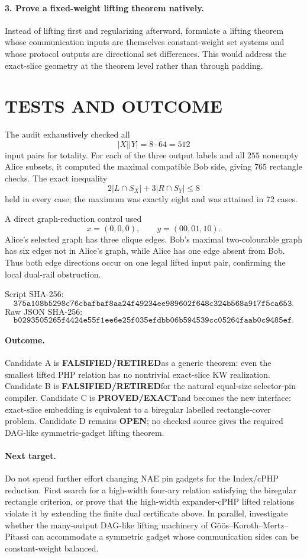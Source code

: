 \documentclass[11pt]{article}
\newcommand{\EXACT}{\textbf{PROVED/EXACT}}
\newcommand{\OPEN}{\textbf{OPEN}}
\newcommand{\RET}{\textbf{FALSIFIED/RETIRED}}
\begin{document}
\paragraph{3. Prove a fixed-weight lifting theorem natively.}
Instead of lifting first and regularizing afterward, formulate a lifting theorem whose communication inputs are themselves constant-weight set systems and whose protocol outputs are directional set differences. This would address the exact-slice geometry at the theorem level rather than through padding.

\section{TESTS AND OUTCOME}
The audit exhaustively checked all
\[
|X||Y|=8\cdot64=512
\]
input pairs for totality. For each of the three output labels and all $255$ nonempty Alice subsets, it computed the maximal compatible Bob side, giving $765$ rectangle checks. The exact inequality
\[
2|L\cap S_X|+3|R\cap S_Y|\le8
\]
held in every case; the maximum was exactly eight and was attained in 72 cases.

A direct graph-reduction control used
\[
x=(0,0,0),\qquad
y=(00,01,10).
\]
Alice's selected graph has three clique edges. Bob's maximal two-colourable graph has six edges not in Alice's graph, while Alice has one edge absent from Bob. Thus both edge directions occur on one legal lifted input pair, confirming the local dual-rail obstruction.

Script SHA-256:
\[
\texttt{375a108b5298c76cbafbaf8aa24f49234ee989602f648c324b568a917f5ca653}.
\]
Raw JSON SHA-256:
\[
\texttt{b0293505265f4424e55f1ee6e25f035efdbb06b594539cc05264faab0c9485ef}.
\]

\paragraph{Outcome.}
Candidate A is \RET as a generic theorem: even the smallest lifted PHP relation has no nontrivial exact-slice KW realization. Candidate B is \RET for the natural equal-size selector-pin compiler. Candidate C is \EXACT and becomes the new interface: exact-slice embedding is equivalent to a biregular labelled rectangle-cover problem. Candidate D remains \OPEN; no checked source gives the required DAG-like symmetric-gadget lifting theorem.

\paragraph{Next target.}
Do not spend further effort changing NAE pin gadgets for the Index/cPHP reduction. First search for a high-width four-ary relation satisfying the biregular rectangle criterion, or prove that the high-width expander-cPHP lifted relations violate it by extending the finite dual certificate above. In parallel, investigate whether the many-output DAG-like lifting machinery of G\"o\"os--Koroth--Mertz--Pitassi can accommodate a symmetric gadget whose communication sides can be constant-weight balanced.
\end{document}
